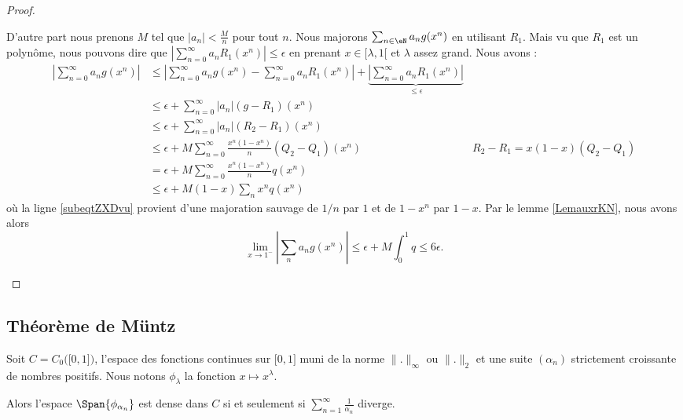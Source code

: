 \begin{proof}
\begin{subproof}
        D'autre part nous prenons \( M\) tel que \( | a_n |<\frac{ M }{ n }\) pour tout \( n\). Nous majorons \( \sum_{n \in \eN}a_ng(x^n)\) en utilisant \( R_1\). Mais vu que \( R_1\) est un polynôme, nous pouvons dire que \( | \sum_{n=0}^{\infty}a_nR_1(x^n) |\leq \epsilon\) en prenant \( x\in\mathopen[ \lambda , 1 [\) et \( \lambda\) assez grand. Nous avons :
        \begin{subequations}
            \begin{align}
                \left| \sum_{n=0}^{\infty}a_ng(x^n) \right| &\leq\left| \sum_{n=0}^{\infty}a_ng(x^n)-\sum_{n=0}^{\infty}a_nR_1(x^n) \right| +\underbrace{\left| \sum_{n=0}^{\infty}a_nR_1(x^n) \right|}_{\leq \epsilon} \\
                &\leq \epsilon+\sum_{n=0}^{\infty}| a_n |(g-R_1)(x^n)\\
                &\leq \epsilon+\sum_{n=0}^{\infty}| a_n |(R_2-R_1)(x^n)\\
                &\leq \epsilon+M\sum_{n=0}^{\infty}\frac{ x^n(1-x^n) }{ n }(Q_2-Q_1)(x^n)   &R_2-R_1=x(1-x)(Q_2-Q_1)\\
                &=\epsilon+M\sum_{n=0}^{\infty}\frac{ x^n(1-x^n) }{ n }q(x^n)\\
                &\leq \epsilon+M(1-x)\sum_nx^nq(x^n)   \label{subeqtZXDvu} 
            \end{align}
        \end{subequations}
        où la ligne \eqref{subeqtZXDvu} provient d'une majoration sauvage de \( 1/n\) par \( 1\) et de \( 1-x^n\) par \( 1-x\). Par le lemme \ref{LemauxrKN}, nous avons alors
        \begin{equation}
            \lim_{x\to 1^-} | \sum_na_ng(x^n) |\leq \epsilon+M\int_0^1q\leq 6\epsilon.
        \end{equation}
    \end{subproof}
\end{proof}

\subsection{Théorème de Müntz}

\begin{theorem}  \label{ThoAEYDdHp}
    Soit \( C=C_0\big( \mathopen[ 0 , 1 \mathclose] \big)\), l'espace des fonctions continues sur \( \mathopen[ 0 , 1 \mathclose]\) muni de la norme \( \| . \|_{\infty}\) ou \( \| . \|_2\) et une suite \( (\alpha_n)\) strictement croissante de nombres positifs. Nous notons \( \phi_{\lambda}\) la fonction \( x\mapsto x^{\lambda}\).

    Alors l'espace \( \Span\{ \phi_{\alpha_n} \}\) est dense dans \( C\) si et seulement si \( \sum_{n=1}^{\infty}\frac{1}{ \alpha_n }\) diverge.
\end{theorem}

